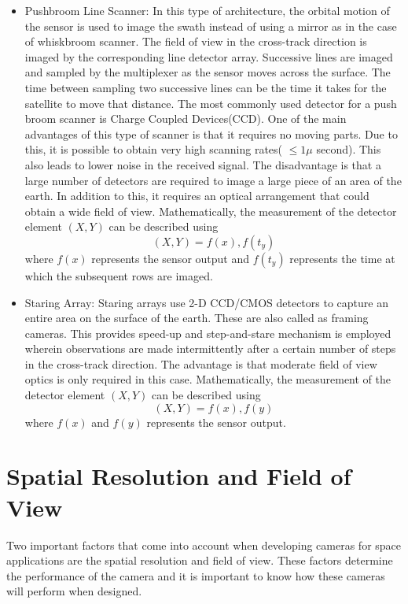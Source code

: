 \begin{itemize}
\item Pushbroom Line Scanner: In this type of architecture, the orbital motion of the sensor is used to image the swath instead of using a mirror as in the case of whiskbroom scanner. The field of view in the cross-track direction is imaged by the corresponding line detector array. Successive lines are imaged and sampled by the multiplexer as the sensor moves across the surface. The time between sampling two successive lines can be the time it takes for the satellite to move that distance. The most commonly used detector for a push broom scanner is Charge Coupled Devices(CCD). One of the main advantages of this type of scanner is that it requires no moving parts. Due to this, it is possible to obtain very high scanning rates( $\leq 1 \mu$ second). This also leads to lower noise in the received signal\cite{SpInst}. The disadvantage is that a large number of detectors are required to image a large piece of an area of the earth. In addition to this, it requires an optical arrangement that could obtain a wide field of view. Mathematically, the measurement of the detector element $(X, Y)$ can be described using 
$$
(X, Y) = f(x), f(t_y)
$$
where $f(x)$ represents the sensor output and $f(t_y)$ represents the time at which the subsequent rows are imaged.  
\item Staring Array: Staring arrays use 2-D CCD/CMOS detectors to capture an entire area on the surface of the earth. These are also called as framing cameras. This provides speed-up and step-and-stare mechanism is employed wherein observations are made intermittently after a certain number of steps in the cross-track direction. The advantage is that moderate field of view optics is only required in this case\cite{SpInst}. Mathematically, the measurement of the detector element $(X, Y)$ can be described using 
$$
(X, Y) = f(x), f(y)
$$
where $f(x)$ and $f(y)$ represents the sensor output.
\end{itemize}

\section{Spatial Resolution and Field of View}
Two important factors that come into account when developing cameras for space applications are the spatial resolution and field of view. These factors determine the performance of the camera and it is important to know how these cameras will perform when designed.


